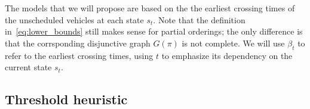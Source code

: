 \documentclass[a4paper]{article}
\theoremstyle{definition}
\theoremstyle{plain}
\begin{document}
%
%


The models that we will propose are based on the the earliest crossing times of
the unscheduled vehicles at each state $s_{t}$. Note that the definition in~\eqref{eq:lower_bounds}
still makes sense for partial orderings; the only difference is that the
corrsponding disjunctive graph $G(\pi)$ is not complete. We will use $\beta_{t}$ to
refer to the earliest crossing times, using $t$ to emphasize its dependency on
the current state $s_{t}$.



\subsection{Threshold heuristic}
\end{document}
